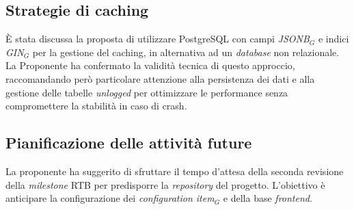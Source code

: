 \documentclass[10pt, letterpaper]{article}
\begin{document}
\subsection{Strategie di caching}
È stata discussa la proposta di utilizzare PostgreSQL con campi \textit{JSONB$_{G}$} e indici \textit{GIN$_{G}$} per la gestione del caching, in alternativa ad un \textit{database} non relazionale. La Proponente ha confermato la validità tecnica di questo approccio, raccomandando però particolare attenzione alla persistenza dei dati e alla gestione delle tabelle \textit{unlogged} per ottimizzare le performance senza compromettere la stabilità in caso di crash.

\subsection{Pianificazione delle attività future}
La proponente ha suggerito di sfruttare il tempo d'attesa della seconda revisione della \textit{milestone} RTB per predisporre la \textit{repository} del progetto. L'obiettivo è anticipare la configurazione dei \textit{configuration item$_{G}$} e della base \textit{frontend}.




\makeDecisionTable


\makeTodoTable
\end{document}
